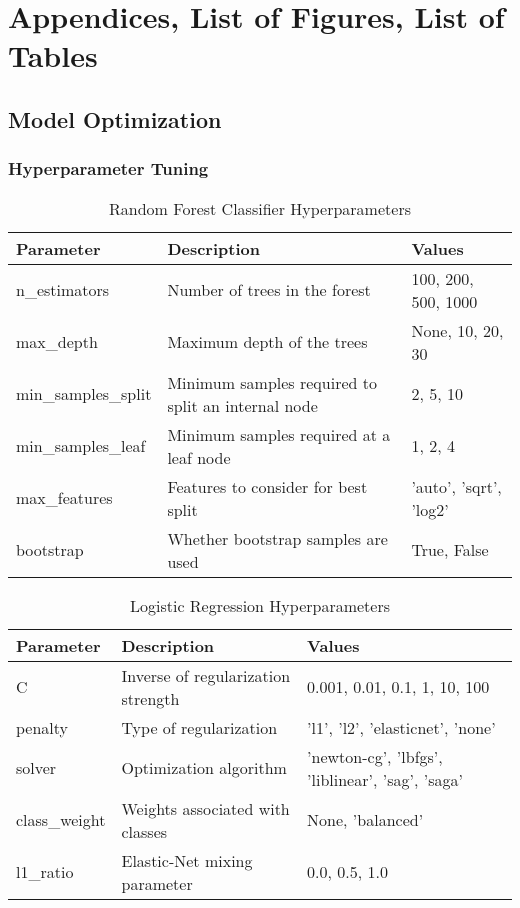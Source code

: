 \appendix%


\chapter{Appendices, List of Figures, List of Tables}


	\section{Model Optimization}

		\subsection{Hyperparameter Tuning} \label{sec:hyperparameters}
			\begin{table}[htbp]
				\centering
				\begin{tabular}{|l|l|l|}
					\hline
					\textbf{Parameter} & \textbf{Description} & \textbf{Values} \\
					\hline
					n\_estimators & Number of trees in the forest & 100, 200, 500, 1000
					\\
					max\_depth & Maximum depth of the trees & None, 10, 20, 30
					\\
					min\_samples\_split & Minimum samples required to split an internal node & 2, 5, 10
					\\
					min\_samples\_leaf & Minimum samples required at a leaf node & 1, 2, 4
					\\
					max\_features & Features to consider for best split & 'auto', 'sqrt',
					'log2'
					\\
					bootstrap & Whether bootstrap samples are used & True, False
					\\
					\hline
				\end{tabular}
				\caption{Random Forest Classifier Hyperparameters}
				\label{tab:random-forest-params}
			\end{table}

			\begin{table}[htbp]
				\centering
				\begin{tabular}{|l|l|l|}
					\hline
					\textbf{Parameter} & \textbf{Description} & \textbf{Values}
					\\
					\hline
					C & Inverse of regularization strength & 0.001, 0.01, 0.1, 1, 10, 100
					\\
					penalty & Type of regularization & 'l1', 'l2', 'elasticnet', 'none'
					\\
					solver & Optimization algorithm & 'newton-cg', 'lbfgs', 'liblinear', 'sag',
					'saga' \\
					class\_weight & Weights associated with classes & None, 'balanced'
					\\
					l1\_ratio & Elastic-Net mixing parameter & 0.0, 0.5, 1.0
					\\
					\hline
				\end{tabular}
				\caption{Logistic Regression Hyperparameters}
				\label{tab:logistic-regression-params}
			\end{table}

